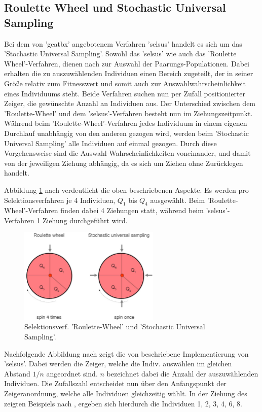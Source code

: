 \subsection{Roulette Wheel und Stochastic Universal Sampling}
Bei dem von 'geatbx' angebotenem Verfahren 'selsus' handelt es sich um das
'Stochastic Universal Sampling'. Sowohl das 'selsus' wie auch das 'Roulette
Wheel'-Verfahren, dienen nach \cite{url:geatbx-documentation}
zur Auswahl der Paarungs-Populationen. Dabei erhalten die zu auszuwählenden
Individuen einen Bereich zugeteilt, der in seiner Größe relativ zum 
Fitnesswert und somit auch zur Auswahlwahrscheinlichkeit eines Individuums
steht. Beide Verfahren suchen nun per Zufall positionierter Zeiger, die
gewünschte Anzahl an Individuen aus. Der Unterschied zwischen dem 'Roulette-Wheel'
und dem 'selsus'-Verfahren besteht nun im Ziehungszeitpunkt. Während beim
'Roulette-Wheel'-Verfahren jedes Individuum in einem eigenen Durchlauf unabhängig
von den anderen gezogen wird, werden beim 'Stochastic Universal Sampling' alle
Individuen auf einmal gezogen. Durch diese Vorgehensweise sind die 
Auswahl-Wahrscheinlichkeiten voneinander, und damit von der jeweiligen Ziehung
abhängig, da es sich um Ziehen ohne Zurücklegen handelt.

Abbildung \ref{fig:RouletteSelsus} nach \cite{url:RouletteSelsus} verdeutlicht 
die oben beschriebenen Aspekte.
Es werden pro Selektionsverfahren je 4 Individuen, $Q_1$ bis $Q_4$ ausgewählt.
Beim 'Roulette-Wheel'-Verfahren finden dabei 4 Ziehungen statt, während beim
'selsus'-Verfahren 1 Ziehung durchgeführt wird.  

\begin{figure} 
  \centering
  \includegraphics[width=0.6\textwidth]{../images/picRouletteSelsus}
  \caption{Selektionsverf. 'Roulette-Wheel' und 'Stochastic Universal Sampling'.}
  \label{fig:RouletteSelsus}
\end{figure}

Nachfolgende Abbildung nach \cite{url:geatbx-documentation} zeigt die von
\cite{url:geatbx-documentation} beschriebene Implementierung von 'selsus'.
Dabei werden die Zeiger, welche die Indiv. auswählen im gleichen Abstand
$1/n$ angeordnet sind. $n$ bezeichnet dabei die Anzahl der auszuwählenden
Individuen. Die Zufallszahl entscheidet nun über den Anfangspunkt der 
Zeigeranordnung, welche alle Individuen gleichzeitig wählt. In der Ziehung
des zeigten Beispiels nach \cite{url:geatbx-documentation}, ergeben sich 
hierdurch die Individuen 1, 2, 3, 4, 6, 8.
       
